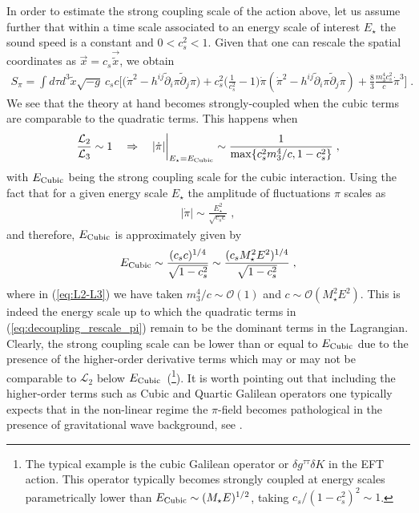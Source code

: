 \documentclass[a4paper,11pt]{article}
\numberwithin{equation}{section}
\begin{document}
In order to estimate the strong coupling scale of the action above, let us assume further that within a time scale associated to an energy scale of interest $E_\star$ the sound speed is a constant and $0 < c_s^2 < 1$. Given that one can rescale the spatial coordinates as $\vec{x} = c_s \vec{\tilde{x}}$, we obtain
\begin{align}
S_\pi = \int d\tau d^3\tilde{x} \sqrt{-g}~c_sc\bigg[\bigg(\dot{\pi}^2 - h^{ij}\tilde{\partial}_i \pi \tilde{\partial}_j \pi \bigg) + c_s^2  \bigg(\frac{1}{c_s^2} - 1 \bigg) \dot{\pi} (\dot{\pi}^2 - h^{ij} \tilde{\partial}_i \pi \tilde{\partial}_j \pi) + \frac{8}{3} \frac{m_3^4c_s^2}{c} \dot{\pi}^3 \bigg] \;. \label{eq:decoupling_rescale_pi}
\end{align}
We see that the theory at hand becomes strongly-coupled when the cubic terms are comparable to the quadratic terms. This happens when 
\begin{align}
\frac{\mathcal{L}_2}{\mathcal{L}_3} \sim 1 \quad \Rightarrow \quad |\dot{\pi}|\bigg|_{E_\star = E_{\rm Cubic}} \sim \frac{1}{{\rm max}\{c_s^2 m_3^4/c, 1-c_s^2\}} \;, \label{eq:L2-L3}
\end{align}
with $E_{\rm Cubic}$ being the strong coupling scale for the cubic interaction. Using the fact that for a given energy scale $E_\star$ the amplitude of fluctuations $\pi$ scales as 
\begin{align}
|\dot{\pi}| \sim \frac{E^2_\star}{\sqrt{c_s c}} \;,
\end{align}
and therefore, $E_{\rm Cubic}$ is approximately given by
\begin{align}\label{eq:E_cubic}
E_{\rm Cubic} \sim \frac{(c_s c)^{1/4}}{\sqrt{1 - c_s^2}} \sim \frac{(c_s M_\star^2 E^2)^{1/4}}{\sqrt{1 - c_s^2}} \;,
\end{align}
where in (\ref{eq:L2-L3}) we have taken $m_3^4/c \sim \mathcal{O}(1)$ and $c \sim \mathcal{O}(M_\star^2 E^2)$. This is indeed the energy scale up to which the quadratic terms in (\ref{eq:decoupling_rescale_pi}) remain to be the dominant terms in the Lagrangian. Clearly, the strong coupling scale can be lower than or equal to $E_{\rm Cubic}$ due to the presence of the higher-order derivative terms which may or may not be comparable to $\mathcal{L}_2$ below $E_{\rm Cubic}$~(\footnote{The typical example is the cubic Galilean operator or $\delta g^{\tau\tau} \delta K$ in the EFT action. This operator typically  becomes strongly coupled at energy scales parametrically lower than $E_{\rm Cubic} \sim (M_\star E)^{1/2}$, taking $c_s/(1 - c_s^2)^2 \sim 1$.}). It is worth pointing out that including the higher-order terms such as Cubic and Quartic Galilean operators one typically expects that in the non-linear regime the $\pi$-field becomes pathological in the presence of gravitational wave background, see \cite{Creminelli:2019kjy}.
\end{document}
